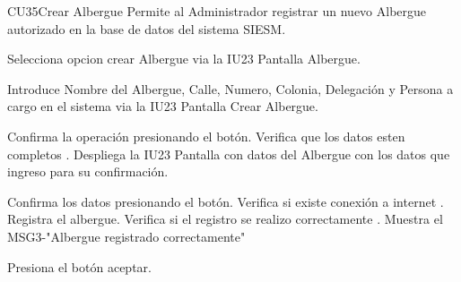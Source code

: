 \begin{UseCase}{CU35}{Crear Albergue}{
		Permite al Administrador registrar un nuevo Albergue autorizado en la base de datos del sistema SIESM.\\
		
}
	
\end{UseCase}



\begin{UCtrayectoria}
	\item\UCactor Selecciona opcion crear Albergue via la IU23 Pantalla Albergue.
	\item\UCactor Introduce Nombre del Albergue, Calle, Numero, Colonia, Delegación y Persona a cargo en el sistema via la IU23 Pantalla Crear Albergue.
	\item\UCactor Confirma la operación presionando el botón.
	\UCpaso Verifica que los datos esten completos .
	\UCpaso Despliega la IU23 Pantalla con datos del Albergue con los datos que ingreso para su confirmación.
	\item\UCactor Confirma los datos presionando el botón.
	\UCpaso Verifica si existe conexión a internet .
	\UCpaso Registra el albergue.
	\UCpaso Verifica si el registro se realizo correctamente .
	\UCpaso Muestra el MSG3-"Albergue registrado correctamente"
	\item\UCactor Presiona el botón aceptar.
\end{UCtrayectoria}


